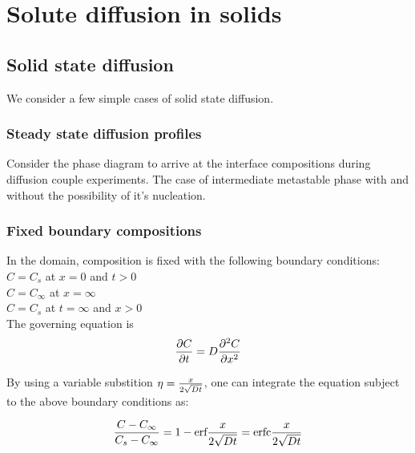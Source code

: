 \chapter{Solute diffusion in solids}

\section{Solid state diffusion}

We consider a few simple cases of solid state diffusion.

\subsection{Steady state diffusion profiles}

Consider the phase diagram to arrive at the interface compositions during diffusion couple experiments. The case of intermediate metastable phase with and without the possibility of it's nucleation. 

\subsection{Fixed boundary compositions}

In the domain, composition is fixed with the following boundary conditions:\\
$C = C_s$ at $x = 0$ and $t > 0$\\
$C = C_\infty$ at $x = \infty$ \\
$C = C_s$ at $t = \infty$ and $x > 0$\\

The governing equation is $$ {\partial C \over \partial t} = D {\partial^2 C
\over \partial x^2} $$

By using a variable substition $\eta = {x \over 2 \sqrt{Dt}}$, one can integrate
the equation subject to the above boundary conditions as:

$$ {C - C_\infty \over C_s - C_\infty} = 1 - \text{erf} {x \over 2 \sqrt{Dt}} =
\text{erfc} {x \over 2 \sqrt{Dt}}$$

